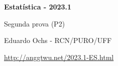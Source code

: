 \documentclass[oneside,12pt]{article}
\begin{document}
\pu

\def\minibalas#1{{
  \unitlength=5pt
  \setdotdims{0.5}{0.2}
  \scalebox{0.7}{$
    \ga{#1}
  $}}}
\def\MBA#1#2#3{#1 \; ⇒ \; \minibalas{#2}}
\def\MBB#1#2#3{P(#1) = #3}
\def\MBC#1#2#3{\begin{array}{rcl}
   #1\phantom{i} &⇒& \minibalas{#2} \\[-2pt]
  P(#1) &=& #3 \\
  \end{array}}





\pu



%

\thispagestyle{empty}

\begin{center}

\vspace*{1.2cm}

{\bf \Large Estatística - 2023.1}

\bsk

Segunda prova (P2)

\bsk

Eduardo Ochs - RCN/PURO/UFF

\url{http://anggtwu.net/2023.1-ES.html}

\end{center}
\end{document}
